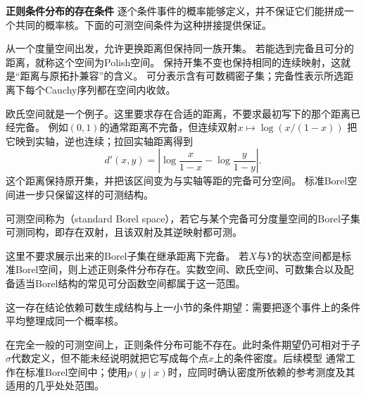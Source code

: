 \par\medskip\noindent\textbf{正则条件分布的存在条件}\quad
逐个条件事件的概率能够定义，并不保证它们能拼成一个共同的概率核。下面的可测空间条件为这种拼接提供保证。
\begin{definition}[Polish空间]
  \label{def:probability-polish-space}
从一个度量空间出发，允许更换距离但保持同一族开集。
若能选到完备且可分的距离，就称这个空间为Polish空间。
保持开集不变也保持相同的连续映射，这就是“距离与原拓扑兼容”的含义。
可分表示含有可数稠密子集；完备性表示所选距离下每个Cauchy序列都在空间内收敛。
\end{definition}
欧氏空间就是一个例子。这里要求存在合适的距离，不要求最初写下的那个距离已经完备。
例如\((0,1)\)的通常距离不完备，但连续双射\(x\mapsto\log(x/(1-x))\)
把它映到实轴，逆也连续；拉回实轴距离得到
\[
 d'(x,y)=\left|\log\frac{x}{1-x}-\log\frac{y}{1-y}\right|.
\]
这个距离保持原开集，并把该区间变为与实轴等距的完备可分空间。
标准Borel空间进一步只保留这样的可测结构。
\begin{definition}[标准Borel空间]
  \label{def:probability-standard-borel-space}
  可测空间称为（standard Borel space），若它与某个完备可分度量空间的Borel子集可测同构，即存在双射，且该双射及其逆映射都可测。
\end{definition}
这里不要求展示出来的Borel子集在继承距离下完备。
若\(X\)与\(Y\)的状态空间都是标准Borel空间，则上述正则条件分布存在。实数空间、欧氏空间、可数集合以及配备适当Borel结构的常见可分函数空间都属于这一范围。

这一存在结论依赖可数生成结构与上一小节的条件期望：需要把逐个事件上的条件平均整理成同一个概率核。

在完全一般的可测空间上，正则条件分布可能不存在。此时条件期望仍可相对于子\(\sigma\)代数定义，但不能未经说明就把它写成每个点\(x\)上的条件密度。后续模型
通常工作在标准Borel空间中；使用\(p(y\mid x)\)时，应同时确认密度所依赖的参考测度及其适用的几乎处处范围。

